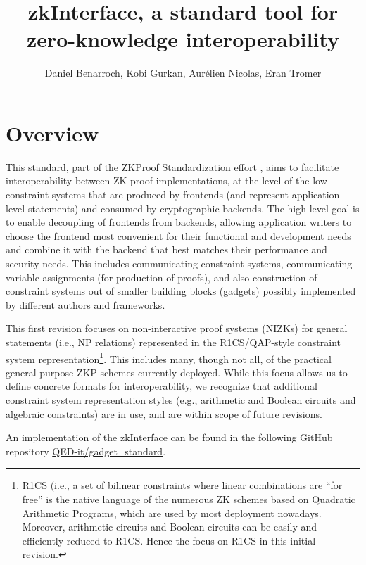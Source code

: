 \documentclass[a4paper,12pt]{article}
\title{zkInterface, a standard tool for zero-knowledge interoperability}
\author{Daniel Benarroch, Kobi Gurkan, Aurélien Nicolas, Eran Tromer}
\newcommand{\enote}[1]{\dtcolornote[Eran]{darkgreen}{#1}}
\begin{document}
\maketitle

\enote{Add abstract}

\tableofcontents
\section{Overview}
This standard, part of the ZKProof Standardization effort \cite{ZKProofSecurity, ZKProofImplementation, ZKProofApplications}, aims to facilitate interoperability between ZK proof implementations, at the level of the low-constraint systems that are produced by frontends (and represent application-level statements) and consumed by cryptographic backends. The high-level goal is to enable decoupling of frontends from backends, allowing application writers to choose the frontend most convenient for their functional and development needs and combine it with the backend that best matches their performance and security needs. This includes communicating constraint systems, communicating variable assignments (for production of proofs), and also construction of constraint systems out of smaller building blocks (gadgets) possibly implemented by different authors and frameworks.

This first revision focuses on non-interactive proof systems (NIZKs) for general statements (i.e., NP relations) represented in the R1CS/QAP-style constraint system representation\footnote{R1CS (i.e., a set of bilinear constraints where linear combinations are ``for free'' is the native language of the numerous ZK schemes based on Quadratic Arithmetic Programs, which are used by most deployment nowadays. Moreover, arithmetic circuits and Boolean circuits can be easily and efficiently reduced to R1CS. Hence the focus on R1CS in this initial revision.}. This includes many, though not all, of the practical general-purpose ZKP schemes currently deployed. While this focus allows us to define concrete formats for interoperability, we recognize that additional constraint system representation styles (e.g., arithmetic and Boolean circuits and algebraic constraints) are in use, and are within scope of future revisions.

An implementation of the zkInterface \cite{zkinterface} can be found in the following GitHub repository \href{https://github.com/QED-it/gadget_standard}{QED-it/gadget\_standard}.
\end{document}
